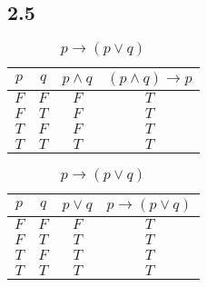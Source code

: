 \documentclass[10pt]{ctexart}
\begin{document}
    \newpage
    \subsection*{2.5}
        \begin{table}[h]
            \centering
            \renewcommand{\thesubtable}{\alph{subtable}}
            \begin{subtable}[h]{2in}
                \setlength{\abovecaptionskip}{0pt}
                \setlength{\belowcaptionskip}{0pt}
                \centering
                \caption{$(p \wedge q) \rightarrow p$}
                \begin{tabular}{|c|c|c|c|}
                    \hline
                    $p$ & $q$ & $p \wedge q$ & $(p \wedge q) \rightarrow p$ \\ 
                    \hline
                    $F$ & $F$ & $F$ & $T$ \\ 
                    \hline
                    $F$ & $T$ & $F$ & $T$ \\ 
                    \hline
                    $T$ & $F$ & $F$ & $T$ \\ 
                    \hline
                    $T$ & $T$ & $T$ & $T$ \\ 
                    \hline
                \end{tabular}
            \end{subtable}
            \begin{subtable}[h]{3in}
                \setlength{\abovecaptionskip}{0pt}
                \setlength{\belowcaptionskip}{0pt}
                \centering
                \caption{$p \rightarrow (p \vee q)$}
                \begin{tabular}{|c|c|c|c|}
                    \hline
                    $p$ & $q$ & $p \vee q$ & $p \rightarrow (p \vee q)$ \\
                    \hline
                    $F$ & $F$ & $F$ & $T$ \\ 
                    \hline
                    $F$ & $T$ & $T$ & $T$ \\ 
                    \hline
                    $T$ & $F$ & $T$ & $T$ \\ 
                    \hline
                    $T$ & $T$ & $T$ & $T$ \\ 
                    \hline
                \end{tabular}
            \end{subtable}
            \begin{subtable}[h]{2in}

\end{subtable}
\end{table}
\end{document}
